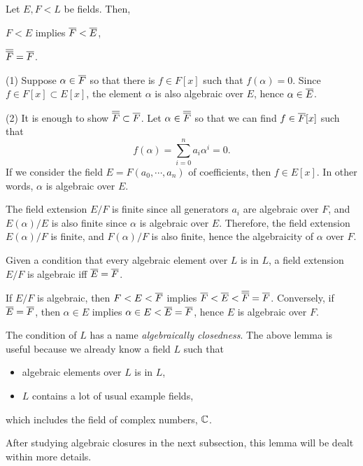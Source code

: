 \documentclass{../exp}
\begin{document}
\begin{lem}
Let $E,F<L$ be fields.
Then,
\begin{cond}
\item $F<E$ implies $\overline F<\overline E$,
\item $\overline{\overline F}=\overline F$.
\end{cond}
\begin{pf}
(1)
Suppose $\alpha\in\overline F$ so that there is $f\in F[x]$ such that $f(\alpha)=0$.
Since $f\in F[x]\subset E[x]$, the element $\alpha$ is also algebraic over $E$, hence $\alpha\in\overline E$.

(2)
It is enough to show $\overline{\overline F}\subset\overline F$.
Let $\alpha\in\overline{\overline F}$ so that we can find $f\in\overline F[x]$ such that
\[f(\alpha)=\sum_{i=0}^na_i\alpha^i=0.\]
If we consider the field $E=F(a_0,\cdots,a_n)$ of coefficients, then $f\in E[x]$.
In other words, $\alpha$ is algebraic over $E$.

The field extension $E/F$ is finite since all generators $a_i$ are algebraic over $F$, and $E(\alpha)/E$ is also finite since $\alpha$ is algebraic over $E$.
Therefore, the field extension $E(\alpha)/F$ is finite, and $F(\alpha)/F$ is also finite, hence the algebraicity of $\alpha$ over $F$.
\end{pf}
\end{lem}
\begin{lem}
Given a condition that every algebraic element over $L$ is in $L$, a field extension $E/F$ is algebraic iff $\overline E=\overline F$.
\end{lem}
\begin{pf}
If $E/F$ is algebraic, then $F<E<\overline F$ implies $\overline F<\overline E<\overline{\overline F}=\overline F$.
Conversely, if $\overline E=\overline F$, then $\alpha\in E$ implies $\alpha\in E<\overline E=\overline F$, hence $E$ is algebraic over $F$.
\end{pf}
\begin{rmk}
The condition of $L$ has a name \emph{algebraically closedness}.
The above lemma is useful because we already know a field $L$ such that
\begin{itemize}
\item algebraic elements over $L$ is in $L$,
\item $L$ contains a lot of usual example fields,
\end{itemize}
which includes the field of complex numbers, $\mathbb{C}$.

After studying algebraic closures in the next subsection, this lemma will be dealt within more details.
\end{rmk}
\end{document}
